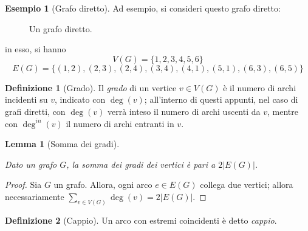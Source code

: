 \documentclass[14pt]{extreport}
\newtheorem{lemma}{Lemma}[subsection]
\theoremstyle{definition}
\newtheorem{definition}{Definizione}[subsection]
\theoremstyle{definition}
\newtheorem{example}{Esempio}[subsection]
\begin{document}
\begin{example}[Grafo diretto]
    Ad esempio, si consideri questo grafo diretto:

    \begin{figure}[H]
        \centering
        \caption{Un grafo diretto.}
    \end{figure}

    in esso, si hanno $$V(G) = \{1, 2, 3, 4, 5, 6\}$$ $$E(G) = \{(1, 2), (2, 3), (2, 4), (3, 4), (4, 1), (5, 1), (6, 3), (6, 5)\}$$
\end{example}

\begin{definition}[Grado]
    Il \textit{grado} di un vertice $v \in V(G)$ è il numero di archi incidenti su $v$, indicato con $\deg(v)$; all'interno di questi appunti, nel caso di grafi diretti, con $\deg(v)$ verrà inteso il numero di archi uscenti da $v$, mentre con $\deg^{in}(v)$ il numero di archi entranti in $v$.
\end{definition}

\begin{lemma}[Somma dei gradi]
    \label{Somma dei gradi}

    Dato un grafo $G$, la somma dei gradi dei vertici è pari a $2 |E(G)|$.
\end{lemma}

\begin{proof}
    Sia $G$ un grafo. Allora, ogni arco $e \in E(G)$ collega due vertici; allora necessariamente $\displaystyle \sum_{v \in V(G)}{\deg(v)} = 2 |E(G)|$.
\end{proof}

\begin{definition}[Cappio]
    Un arco con estremi coincidenti è detto \textit{cappio}.
\end{definition}
\end{document}

